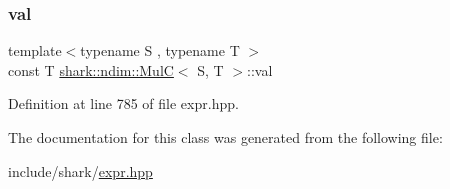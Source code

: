 \subsubsection{\texorpdfstring{val}{val}}
{\footnotesize\ttfamily template$<$typename S , typename T $>$ \\
const T \hyperlink{classshark_1_1ndim_1_1_mul_c}{shark\+::ndim\+::\+MulC}$<$ S, T $>$\+::val\hspace{0.3cm}{\ttfamily [private]}}



Definition at line 785 of file expr.\+hpp.



The documentation for this class was generated from the following file\+:\begin{DoxyCompactItemize}
\item 
include/shark/\hyperlink{expr_8hpp}{expr.\+hpp}\end{DoxyCompactItemize}
